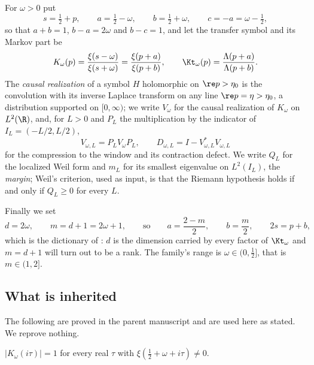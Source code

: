 For $\omega>0$ put
\begin{equation}\label{eq:ab}
 s=\tfrac12+p,\qquad a=\tfrac12-\omega,\qquad b=\tfrac12+\omega,\qquad
 c=-a=\omega-\tfrac12,
\end{equation}
so that $a+b=1$, $b-a=2\omega$ and $b-c=1$, and let the transfer symbol and its
Markov part be
\begin{equation}\label{eq:symbol}
 K_\omega(p)=\frac{\xi(s-\omega)}{\xi(s+\omega)}=\frac{\xi(p+a)}{\xi(p+b)},
 \qquad
 \Kt_\omega(p)=\frac{\Lambda(p+a)}{\Lambda(p+b)} .
\end{equation}
The \emph{causal realization} of a symbol $H$ holomorphic on $\re p>\eta_0$ is
the convolution with its inverse Laplace transform on any line $\re p=\eta>\eta_0$,
a distribution supported on $[0,\infty)$; we write $V_\omega$ for the causal
realization of $K_\omega$ on $L^2(\R)$, and, for $L>0$ and $P_L$ the
multiplication by the indicator of $I_L=(-L/2,L/2)$,
\begin{equation}\label{eq:compression}
 V_{\omega,L}=P_LV_\omega P_L,\qquad D_{\omega,L}=I-V_{\omega,L}^{*}V_{\omega,L}
\end{equation}
for the compression to the window and its contraction defect. We write $Q_L$ for
the localized Weil form and $m_L$ for its smallest eigenvalue on $L^2(I_L)$, the
\emph{margin}; Weil's criterion, used as input, is that the Riemann hypothesis
holds if and only if $Q_L\ge0$ for every $L$.

Finally we set
\begin{equation}\label{eq:dm}
 d=2\omega,\qquad m=d+1=2\omega+1,\qquad\text{so}\qquad
 a=\frac{2-m}2,\qquad b=\frac m2,\qquad 2s=p+b ,
\end{equation}
which is the dictionary of \cite{OpeningNote,WhichDimension}: $d$ is the
dimension carried by every factor of $\Kt_\omega$ and $m=d+1$ will turn out to
be a rank. The family's range is $\omega\in(0,\frac12]$, that is $m\in(1,2]$.

\subsection{What is inherited}\label{sec:inherited}

The following are proved in the parent manuscript \cite{Markov} and are used
here as stated. We reprove nothing.

\begin{proposition}\label{prop:unimodular}
$\lvert K_\omega(i\tau)\rvert=1$ for every real $\tau$ with
$\xi(\frac12+\omega+i\tau)\ne0$.
\end{proposition}

